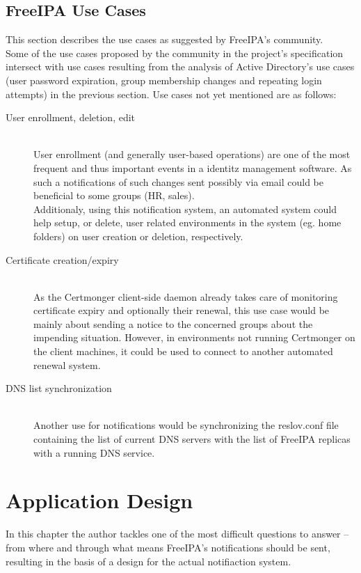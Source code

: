 \section{FreeIPA Use Cases}
This section describes the use cases as suggested by FreeIPA's community. \\
Some of the use cases proposed by the community in the project's specification intersect with use cases resulting from the analysis of Active Directory's use cases (user password expiration, group membership changes and repeating login attempts) in the previous section.
Use cases not yet mentioned are as follows:
\begin{description}
    \item[User enrollment, deletion, edit]\hfill \\
        User enrollment (and generally user-based operations) are one of the most frequent and thus important events in a identitz management software.
        As such a notifications of such changes sent possibly via email could be beneficial to some groups (HR, sales). \\
        Additionaly, using this notification system, an automated system could help setup, or delete, user related environments in the system (eg. home folders) on user creation or deletion, respectively.
    \item[Certificate creation/expiry]\hfill \\
        As the Certmonger client-side daemon already takes care of monitoring certificate expiry and optionally their renewal, this use case would be mainly about sending a notice to the concerned groups
        about the impending situation. However, in environments not running Certmonger on the client machines, it could be used to connect to another automated renewal system.
    \item[DNS list synchronization]\hfill \\
        Another use for notifications would be synchronizing the reslov.conf file containing the list of current DNS servers with the list of FreeIPA replicas with a running DNS service.
\end{description}

\chapter{Application Design}
\label{chp:appDesign}
In this chapter the author tackles one of the most difficult questions to answer -- from where and through what means FreeIPA's notifications should be sent, resulting in the basis of a design for the actual notifiaction system.
